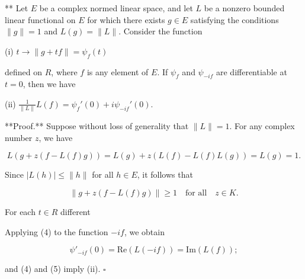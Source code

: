 ** Let $E$ be a complex normed linear space, and let $L$ be a nonzero bounded linear functional on $E$ for which there exists $g \in E$ satisfying the conditions $\|g\| = 1$ and $L(g) = \|L\|$. Consider the function

(i) $t \to \|g + tf\| = \psi_f(t)$

defined on $R$, where $f$ is any element of $E$. If $\psi_f$ and $\psi_{-if}$ are differentiable at $t = 0$, then we have

(ii) $\frac{1}{\|L\|} L(f) = \psi_f'(0) + i \psi_{-if}'(0).$

**Proof.** Suppose without loss of generality that $\|L\| = 1$. For any complex number $z$, we have

$$L(g + z(f - L(f)g)) = L(g) + z(L(f) - L(f)L(g)) = L(g) = 1.$$

Since $|L(h)| \leq \|h\|$ for all $h \in E$, it follows that

$$\|g + z(f - L(f)g)\| \geq 1 \quad \text{for all} \quad z \in K.$$

For each $t \in R$ different

Applying (4) to the function $-if$, we obtain

$$\psi'_{-if}(0) = \text{Re}(L(-if)) = \text{Im}(L(f));$$

and (4) and (5) imply (ii). $\square$